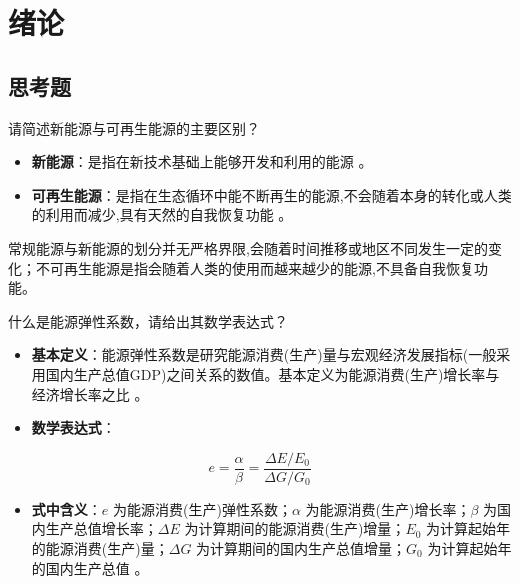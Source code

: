 \chapter{绪论}

\section{思考题}

\begin{problem}\label{exer:think_01_intro_01}
请简述新能源与可再生能源的主要区别？
\end{problem}

\begin{solution}
\begin{itemize}
\item \textbf{新能源}：是指在新技术基础上能够开发和利用的能源 。
\item \textbf{可再生能源}：是指在生态循环中能不断再生的能源,不会随着本身的转化或人类的利用而减少,具有天然的自我恢复功能 。
\end{itemize}
常规能源与新能源的划分并无严格界限,会随着时间推移或地区不同发生一定的变化；不可再生能源是指会随着人类的使用而越来越少的能源,不具备自我恢复功能。
\end{solution}

\begin{problem}\label{exer:think_01_intro_02}
什么是能源弹性系数，请给出其数学表达式？
\end{problem}

\begin{solution}
\begin{itemize}
\item \textbf{基本定义}：能源弹性系数是研究能源消费(生产)量与宏观经济发展指标(一般采用国内生产总值GDP)之间关系的数值。基本定义为能源消费(生产)增长率与经济增长率之比 。
\item \textbf{数学表达式}：
\end{itemize}
\begin{equation*}
e=\frac{\alpha}{\beta}=\frac{\Delta E/E_{0}}{\Delta G/G_{0}}
\end{equation*}
\begin{itemize}
\item \textbf{式中含义}：\(e\) 为能源消费(生产)弹性系数；\(\alpha\) 为能源消费(生产)增长率；\(\beta\) 为国内生产总值增长率；\(\Delta E\) 为计算期间的能源消费(生产)增量；\(E_{0}\) 为计算起始年的能源消费(生产)量；\(\Delta G\) 为计算期间的国内生产总值增量；\(G_{0}\) 为计算起始年的国内生产总值 。
\end{itemize}
\end{solution}


